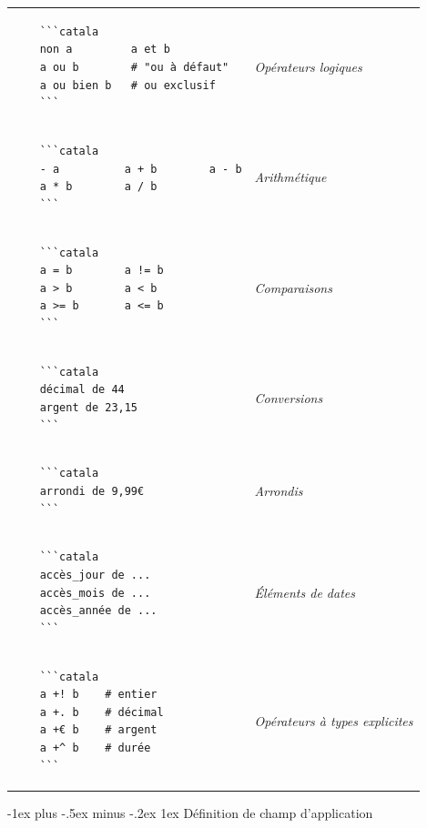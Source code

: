 \documentclass{article}
\makeatletter
\newcommand\articlenormalsize{\fontsize{10pt}{12pt}\selectfont}
\renewcommand{\section}{\@startsection{section}{1}{0mm}%
                                {-1ex plus -.5ex minus -.2ex}%
                                {1ex}%
                                {\normalfont\articlenormalsize\bfseries}}
\newenvironment{catala}{%
  \VerbatimEnvironment
  \let\FV@ListVSpace\relax
  \begin{verbatim}}%
 {\end{verbatim}}
\makeatother
\begin{document}
\begin{multicols}{3}
\begin{tabular}{@{}p{\cola}>{\slshape}p{\colb}@{}}
  \begin{catala}
    ```catala
    non a         a et b
    a ou b        # "ou à défaut"
    a ou bien b   # ou exclusif
    ```
  \end{catala}
  & Opérateurs logiques
  \\
  \begin{catala}
    ```catala
    - a          a + b        a - b
    a * b        a / b
    ```
  \end{catala}
  & Arithmétique
  \\
  
  \begin{catala}
    ```catala
    a = b        a != b
    a > b        a < b
    a >= b       a <= b
    ```
  \end{catala}
  & Comparaisons
  \\
  \begin{catala}
    ```catala
    décimal de 44
    argent de 23,15
    ```
  \end{catala}
  & Conversions
  \\
  \begin{catala}
    ```catala
    arrondi de 9,99€
    ```
  \end{catala}
  & Arrondis
  \\
  \begin{catala}
    ```catala
    accès_jour de ...
    accès_mois de ...
    accès_année de ...
    ```
  \end{catala}
  & Éléments de dates
  \\
  \begin{catala}
    ```catala
    a +! b    # entier
    a +. b    # décimal
    a +€ b    # argent
    a +^ b    # durée
    ```
  \end{catala}
  & Opérateurs à types explicites
  \\
\end{tabular}

\columnbreak

\section{Définition de champ d'application}


\end{multicols}
\end{document}
